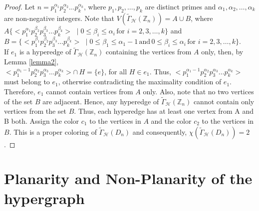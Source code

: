 \documentclass[11pt,a4paper]{article}
\theoremstyle{definition}
\theoremstyle{remark}
\begin{document}
	\begin{proof}
		Let $n=p_1^{\alpha_1}p_2^{\alpha_2} \ldots p_k^{\alpha_k}$, where $p_1, p_2, \ldots, p_k$ are distinct primes and $\alpha_1, \alpha_2, \ldots, \alpha_k$ are non-negative integers. Note that  $V(\tilde{\Gamma}_\mathcal{H}(\mathbb{Z}_n))= A \cup B$, where\\ 
		$A \{<p_1^{\alpha_1}p_2^{\beta_2}p_3^{\beta_3}\ldots p_k^{\beta_k}> \, \, \mid  0 \leq \beta_i \leq \alpha_i  \, \text{for $i=2,3,\ldots,k$}\}$ and \\
		$B=\{<p_1^{\beta_1}p_2^{\beta_2}p_3^{\beta_3}\ldots p_k^{\beta_k}> \, \, \mid  0 \leq \beta_1 \leq \alpha_1 -1 \, \text{and} \, 0 \leq \beta_i \leq \alpha_i \, \text{for $i=2,3,\ldots,k$}\}.$\\
	If $e_1$ is a hyperedge of $\tilde{\Gamma}_\mathcal{H}(\mathbb{Z}_n)$ containing the vertices from $A$ only, then, by Lemma \ref{lemma2},\\ $<p_1^{\alpha_1 -1}p_2^{\alpha_2}p_3^{\alpha_3} \ldots p_k^{\alpha_k}> \cap \,  H =\{e\}$, for all $H \in e_1$.  Thus, $<p_1^{\alpha_1 -1}p_2^{\alpha_2}p_3^{\alpha_3} \ldots p_k^{\alpha_k}>$ must belong to $e_1$, otherwise contradicting the maximality condition of $e_1$. Therefore, $e_1$ cannot contain vertices from $A$ only. Also, note that no two vertices of the set $B$ are adjacent. Hence, any hyperedge of $\tilde{\Gamma}_\mathcal{H}(\mathbb{Z}_n)$ cannot contain only vertices from the set $B$. Thus, each hyperedge has at least one vertex from  A and B both. Assign the color $c_1$ to the vertices in $A$ and the color $c_2$ to the vertices in $B$. This is a proper coloring of $\tilde{\Gamma}_\mathcal{H}(D_n)$ and consequently,  
	$\chi(\tilde{\Gamma}_\mathcal{H}(D_n)) = 2$.
	\end{proof}
	
	\section{Planarity and Non-Planarity of the hypergraph}
		
\end{document}

